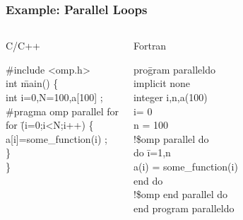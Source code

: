 \documentclass[slidestop,mathserif,compress,xcolor=svgnames]{beamer}
\newenvironment{eblock}[0]
{
\begin{beamerboxesrounded}[upper=uppercol2,lower=lowercol2,shadow=true]}
{\end{beamerboxesrounded}}
\begin{document}
\begin{frame}
  \frametitle{\small Example: Parallel Loops}
  \begin{columns}
    \begin{eblock}{C/C++}
      \begin{tabbing}
        \#include <omp.h> \\
        int \=main() \{ \\
        \> int i=0,N=100,a[100] ; \\
        \> {\color{red}\#pragma omp parallel for} \\
        \>for \=(i=0;i<N;i++) \{ \\
        \>\> a[i]=some\_function(i) ; \\
        \>\} \\
        \}
      \end{tabbing}
    \end{eblock}
    \begin{eblock}{Fortran}
      \begin{tabbing}
        pro\=gram paralleldo \\
        \> implicit none \\
        \> integer i,n,a(100) \\
        \> i= 0 \\
        \> n = 100 \\
        \> {\color{red}!\$omp parallel do} \\
        \> do \=i=1,n \\
        \>\> a(i) = some\_function(i) \\
        \> end do \\
        \> {\color{red}!\$omp end parallel do} \\
        end program paralleldo
      \end{tabbing}
    \end{eblock}
  \end{columns}
\end{frame}
\end{document}
